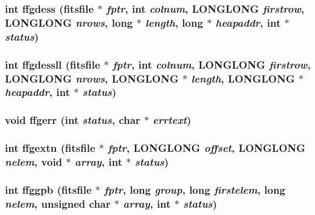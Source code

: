 \subsubsection{\setlength{\rightskip}{0pt plus 5cm}int ffgdess (\bf{fitsfile} $\ast$ {\em fptr}, int {\em colnum}, \bf{LONGLONG} {\em firstrow}, \bf{LONGLONG} {\em nrows}, long $\ast$ {\em length}, long $\ast$ {\em heapaddr}, int $\ast$ {\em status})}\label{fitsio__64_8h_7d0b7c25bc1bd32b8f115343aa4abb93}


\subsubsection{\setlength{\rightskip}{0pt plus 5cm}int ffgdessll (\bf{fitsfile} $\ast$ {\em fptr}, int {\em colnum}, \bf{LONGLONG} {\em firstrow}, \bf{LONGLONG} {\em nrows}, \bf{LONGLONG} $\ast$ {\em length}, \bf{LONGLONG} $\ast$ {\em heapaddr}, int $\ast$ {\em status})}\label{fitsio__64_8h_9d2a8b64f329ddcc261edfacabb4861f}


\subsubsection{\setlength{\rightskip}{0pt plus 5cm}void ffgerr (int {\em status}, char $\ast$ {\em errtext})}\label{fitsio__64_8h_68877812456ad601bf6d5e8f8d9123c2}


\subsubsection{\setlength{\rightskip}{0pt plus 5cm}int ffgextn (\bf{fitsfile} $\ast$ {\em fptr}, \bf{LONGLONG} {\em offset}, \bf{LONGLONG} {\em nelem}, void $\ast$ {\em array}, int $\ast$ {\em status})}\label{fitsio__64_8h_5fc4e41295a193c81ec7cccd1d682ef2}


\subsubsection{\setlength{\rightskip}{0pt plus 5cm}int ffggpb (\bf{fitsfile} $\ast$ {\em fptr}, long {\em group}, long {\em firstelem}, long {\em nelem}, unsigned char $\ast$ {\em array}, int $\ast$ {\em status})}\label{fitsio__64_8h_4f44dabf1398b1faa74931df1070d4ef}


